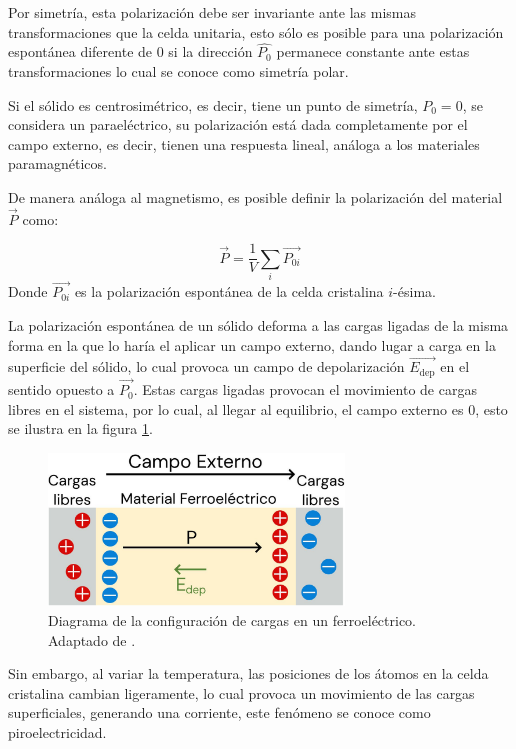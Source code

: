 \documentclass[../main.tex]{subfiles}
\begin{document}
Por simetría, esta polarización debe ser invariante ante las mismas transformaciones que la celda unitaria, esto sólo es posible para una polarización espontánea diferente de 0 si la dirección $\hat{P_{0}}$ permanece constante ante estas transformaciones lo cual se conoce como simetría polar.

Si el sólido es centrosimétrico, es decir, tiene un punto de simetría, $P_0=0$, se considera un paraeléctrico, su polarización está dada completamente por el campo externo, es decir, tienen una respuesta lineal, análoga a los materiales paramagnéticos.


De manera análoga al magnetismo, es posible definir la polarización del material $\vec{P}$ como:

\begin{equation}
    \vec{P}=\dfrac{1}{V}\sum_{i}\vec{P_{0i}}
    \label{eq:polarizacionmicromacro}
\end{equation}
Donde $\vec{P_{0i}}$ es la polarización espontánea de la celda cristalina $i$-ésima.

La polarización espontánea de un sólido deforma a las cargas ligadas de la misma forma en la que lo haría el aplicar un campo externo, dando lugar a carga en la superficie del sólido, lo cual provoca un campo de depolarización $\vec{E_\text{dep}}$ en el sentido opuesto a $\vec{P_0}$. Estas cargas ligadas provocan el movimiento de cargas libres en el sistema, por lo cual, al llegar al equilibrio, el campo externo es 0, esto se ilustra en la figura \ref{fig:ferroelecdiag}.
\begin{figure}[H]
    \centering
    \includegraphics[width=0.7\textwidth]{fig/ferroelecdiag.jpg}
    \caption{Diagrama de la configuración de cargas en un ferroeléctrico. Adaptado de \cite{Qiao2021}.}
    \label{fig:ferroelecdiag}
\end{figure}
Sin embargo, al variar la temperatura, las posiciones de los átomos en la celda cristalina cambian ligeramente, lo cual provoca un movimiento de las cargas superficiales, generando una corriente, este fenómeno se conoce como piroelectricidad.
\end{document}
